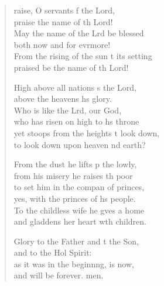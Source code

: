 \begin{verse}
  \begin{patverse}
raise, O servants f the Lord,\Med\\
praise the name of th Lord!\\
May the name of the Lrd be blessed\Med\\
both now and for evrmore!\\
From the rising of the sun t its setting\Med\\
praised be the name of th Lord!

High above all nations \pointup{\i}s the Lord,\Med\\
above the heavens h\pointup{\i}s glory.\\
Who is like the Lrd, our God,\Med\\
who has risen on high to h\pointup{\i}s throne\\
yet stoops from the heights t look down,\Med\\
to look down upon heaven nd earth?

From the dust he lifts p the lowly,\Med\\
from his misery he raises th poor\\
to set him in the compan of princes,\Med\\
yes, with the princes of h\pointup{\i}s people.\\
To the childless wife he g\pointup{\i}ves a home\Med\\
and gladdens her heart w\pointup{\i}th children.

Glory to the Father and t the Son,\Med\\
and to the Hol Spirit:\\
as it was in the beginn\pointup{\i}ng, is now,\Med\\
and will be forever. men.
  \end{patverse}
\end{verse}
